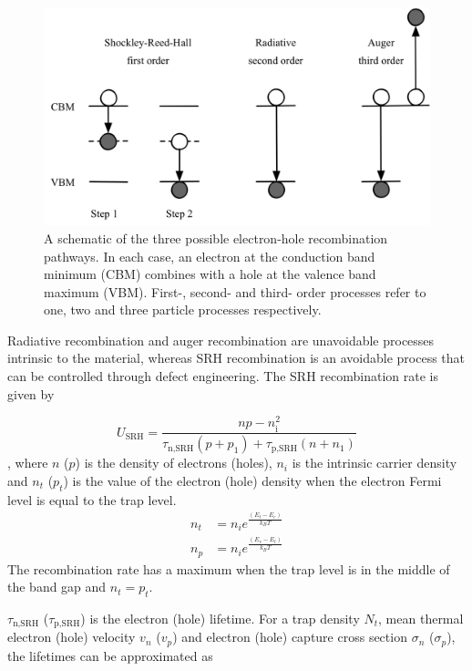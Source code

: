 \begin{figure}[h]
 \centering
   \includegraphics[width=1.0\columnwidth]{figures/ch1/recombination.png}
   \caption[Electron-hole recombination pathways]{A schematic of the three possible electron-hole recombination pathways. In each case, an electron at the conduction band minimum (CBM) combines with a hole at the valence band maximum (VBM). First-, second- and third- order processes refer to one, two and three particle processes respectively.}
   \label{recombination_processes}
 \end{figure}

Radiative recombination and auger recombination are unavoidable processes intrinsic to the material, whereas SRH recombination is an avoidable process that can be controlled through defect engineering. The SRH recombination rate is given by

$$ U_\textrm{SRH} = \frac{np-n_\textrm{i}^2}{\tau_\textrm{n,SRH}(p+p_1)+\tau_\textrm{p,SRH}(n+n_1)} $$,
where $n$ ($p$) is the density of electrons (holes), $n_i$ is the intrinsic carrier density and $n_t$ ($p_t$) is the value of the electron (hole) density when the electron Fermi level is equal to the trap level. 
\begin{align}
n_t &= n_ie^{\frac{(E_t-E_c)}{k_BT}} \\
n_p &= n_ie^{\frac{(E_v-E_t)}{k_BT}}
\end{align}
The recombination rate has a maximum when the trap level is in the middle of the band gap and $n_t = p_t$.

$\tau_\textrm{n,SRH}$ ($\tau_\textrm{p,SRH}$) is the electron (hole) lifetime. For a trap density $N_t$, mean thermal electron (hole) velocity $v_n$ ($v_p$) and electron (hole) capture cross section $\sigma_n$ ($\sigma_p$), the lifetimes can be approximated as 

